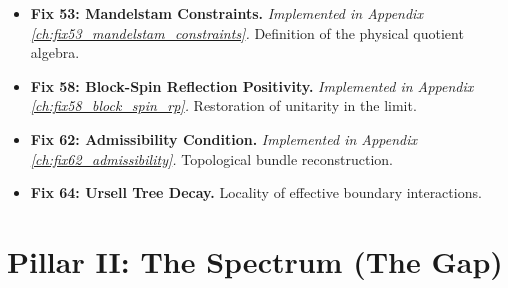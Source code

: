 \begin{itemize}
    \item \textbf{Fix 53: Mandelstam Constraints.} \textit{Implemented in Appendix \ref{ch:fix53_mandelstam_constraints}.} Definition of the physical quotient algebra.
    \item \textbf{Fix 58: Block-Spin Reflection Positivity.} \textit{Implemented in Appendix \ref{ch:fix58_block_spin_rp}.} Restoration of unitarity in the limit.
    \item \textbf{Fix 62: Admissibility Condition.} \textit{Implemented in Appendix \ref{ch:fix62_admissibility}.} Topological bundle reconstruction.
    \item \textbf{Fix 64: Ursell Tree Decay.} Locality of effective boundary interactions.
\end{itemize}

\section{Pillar II: The Spectrum (The Gap)}
